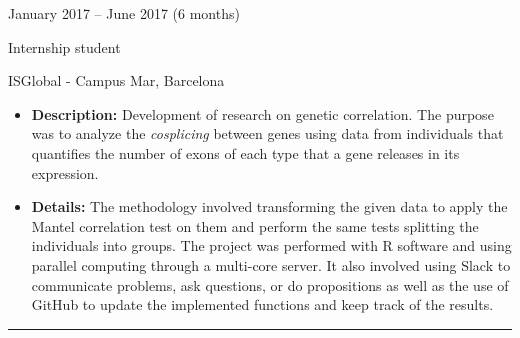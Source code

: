 \documentclass[a4paper,10pt]{article}
\newlength{\cvcolumngapwidth}
\newlength{\cvleftcolumnwidth}
\newlength{\cvrightcolumnwidth}
\newcommand{\cvsectionstyle}[1]{{\normalsize\cvsectionfont\textcolor{cvsectioncolor}{#1}}}
\newcommand{\cvtitlestyle}[1]{{\large\cvtitlefont\textcolor{cvtitlecolor}{#1}}}
\newcommand{\cvdurationstyle}[1]{{\small\cvdurationfont\textcolor{cvdurationcolor}{#1}}}
\newlength{\cvafteritemskipamount}
\newlength{\cvaftersectionskipamount}
\newlength{\cvaftertitleskipamount}
\newlength{\cvparskip}
\newcommand{\cvsection}[1]{
    \begin{minipage}[t]{\cvleftcolumnwidth}
        \raggedleft\cvsectionstyle{#1}
    \end{minipage}%
    \hspace{\cvcolumngapwidth}%
    \begin{minipage}[t]{\cvrightcolumnwidth}
        \textcolor{cvrulecolor}{\rule{\cvrightcolumnwidth}{0.3mm}}
    \end{minipage}

    \vspace{\cvaftersectionskipamount}
}
\newcommand{\cvitem}[2]{
    \begin{minipage}[t]{\cvleftcolumnwidth}
        \raggedleft #1
    \end{minipage}%
    \hspace{\cvcolumngapwidth}%
    \begin{minipage}[t]{\cvrightcolumnwidth}
        \setlength{\parskip}{\cvparskip} #2
    \end{minipage}

    \vspace{\cvafteritemskipamount}
}
\newcommand{\cvtitle}[1]{
    \cvtitlestyle{#1}

    \vspace{\cvaftertitleskipamount}
    \vspace{-\cvparskip}
}
\begin{document}

\cvitem{
    \cvdurationstyle{January 2017 -- June 2017 
    \hspace{15pt} (6 months)}
}{
    \cvtitle{Internship student}

    ISGlobal - Campus Mar, Barcelona
    \vspace{5pt}
    \begin{itemize}[leftmargin=*]
        \item \textbf{Description:} Development of research on genetic correlation. The purpose was to analyze the \textit{cosplicing} between genes using data from individuals that quantifies the number of exons of each type that a gene releases in its expression.
        \vspace{3pt}
        \item \textbf{Details:} The methodology involved transforming the given data to apply the Mantel correlation test on them and perform the same tests splitting the individuals into groups. The project was performed with R software and using parallel computing through a multi-core server. It also involved using Slack to communicate problems, ask questions, or do propositions as well as the use of GitHub to update the implemented functions and keep track of the results.
    \end{itemize}
}



\cvsection{EDUCATION}




           

\end{document}
